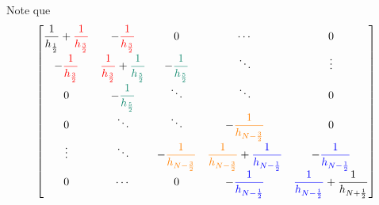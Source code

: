 \begin{frame}
	Note que
	\begin{align*}
		\begin{bmatrix}
			\dfrac{1}{h_{\frac{1}{2}}}+\mathcolor{red}{\mathcolor{red}{\dfrac{1}{h_{\frac{3}{2}}}}} & -\mathcolor{red}{\dfrac{1}{h_{\frac{3}{2}}}}                                              & 0                                                 & \cdots                                                                                          & 0                                                                           \\
			-\mathcolor{red}{\dfrac{1}{h_{\frac{3}{2}}}}                                            & \mathcolor{red}{\dfrac{1}{h_{\frac{3}{2}}}}+\mathcolor{PineGreen}{\dfrac{1}{h_{\frac{5}{2}}}} & -\mathcolor{PineGreen}{\dfrac{1}{h_{\frac{5}{2}}}}    & \ddots                                                                                          & \vdots                                                                      \\
			0                                                                                       & -\mathcolor{PineGreen}{\dfrac{1}{h_{\frac{5}{2}}}}                                            & \ddots                                            & \ddots                                                                                          & 0                                                                           \\
			0                                                                                       & \ddots                                                                                    & \ddots                                            & -\mathcolor{orange}{\dfrac{1}{h_{N-\frac{3}{2}}}}                                               & 0                                                                           \\
			\vdots                                                                                  & \ddots                                                                                    & -\mathcolor{orange}{\dfrac{1}{h_{N-\frac{3}{2}}}} & \mathcolor{orange}{\dfrac{1}{h_{N-\frac{3}{2}}}}+\mathcolor{blue}{\dfrac{1}{h_{N-\frac{1}{2}}}} & -\mathcolor{blue}{\dfrac{1}{h_{N-\frac{1}{2}}}}                             \\
			0                                                                                       & \cdots                                                                                    & 0                                                 & -\mathcolor{blue}{\dfrac{1}{h_{N-\frac{1}{2}}}}                                                 & \mathcolor{blue}{\dfrac{1}{h_{N-\frac{1}{2}}}}+\dfrac{1}{h_{N+\frac{1}{2}}}

\end{bmatrix}
\end{align*}
\end{frame}
